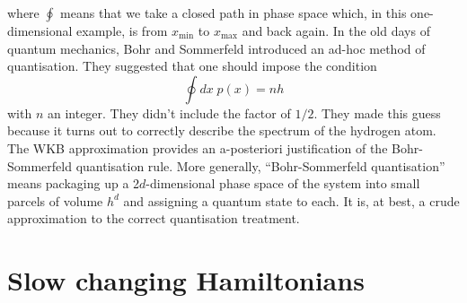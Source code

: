 where $\oint$ means that we take a closed path in phase space which, in this one-dimensional example, is from $x_{\mathrm{min}}$ to $x_{\mathrm{max}}$ and back again.
In the old days of quantum mechanics, Bohr and Sommerfeld introduced an ad-hoc method of quantisation. They suggested that one should impose the condition
\[\oint dx \; p(x) = n h \]
with $n$ an integer. They didn't include the factor of $1/2$. They made this guess because it turns out to correctly describe the spectrum of the hydrogen atom.  The WKB approximation provides an a-posteriori justification of the Bohr-Sommerfeld quantisation rule.
More generally, ``Bohr-Sommerfeld quantisation'' means packaging up a 2$d$-dimensional phase space of the system into small parcels of volume $h^d$ and assigning a quantum state to each. It is, at best, a crude approximation to the correct quantisation treatment.

\section{Slow changing Hamiltonians}

